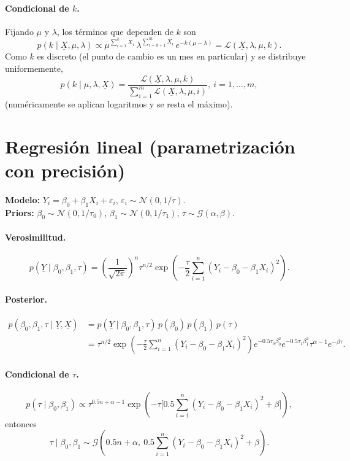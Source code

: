 \documentclass[11pt]{article}
\newcommand{\N}{\mathcal{N}}
\newcommand{\Ga}{\mathcal{G}}
\theoremstyle{definition}
\begin{document}
\paragraph{Condicional de $k$.} Fijando $\mu$ y $\lambda$, los términos que dependen de $k$ son
\[
p(k\mid\underline X,\mu,\lambda)\propto\mu^{\sum_{i=1}^k X_i}\,\lambda^{\sum_{i=k+1}^m X_i}\,e^{-k(\mu-\lambda)}=\mathcal{L}(\underline X,\lambda,\mu,k).
\]
Como $k$ es discreto (el punto de cambio es un mes en particular) y se distribuye uniformemente,
\[
p(k\mid\mu,\lambda,\underline X)=\frac{\mathcal{L}(\underline X,\lambda,\mu,k)}{\sum_{i=1}^m\mathcal{L}(\underline X,\lambda,\mu,i)},\ i=1,\dots,m,
\]
(numéricamente se aplican logaritmos y se resta el máximo).

\section{Regresión lineal (parametrización con precisión)}
\textbf{Modelo:} $Y_i=\beta_0+\beta_1 X_i+\varepsilon_i$, $\varepsilon_i\sim\N(0,1/\tau)$.\\
\textbf{Priors:} $\beta_0\sim\N(0,1/\tau_0)$, $\beta_1\sim\N(0,1/\tau_1)$, $\tau\sim\Ga(\alpha,\beta)$.

\paragraph{Verosimilitud.}
\[
p(\underline Y\mid\beta_0,\beta_1,\tau)=\left(\frac{1}{\sqrt{2\pi}}\right)^n\tau^{n/2}\exp\!\left(-\frac{\tau}{2}\sum_{i=1}^n(Y_i-\beta_0-\beta_1 X_i)^2\right).
\]

\paragraph{Posterior.}
\begin{align*}
p(\beta_0,\beta_1,\tau\mid\underline Y,\underline X)
&=p(\underline Y\mid\beta_0,\beta_1,\tau)\,p(\beta_0)\,p(\beta_1)\,p(\tau)\\
&=\tau^{n/2}\exp\!\left(-\tfrac{\tau}{2}\sum_{i=1}^n(Y_i-\beta_0-\beta_1 X_i)^2\right)e^{-0.5\tau_0\beta_0^2}e^{-0.5\tau_1\beta_1^2}\tau^{\alpha-1}e^{-\beta\tau}.
\end{align*}

\paragraph{Condicional de $\tau$.}
\[
p(\tau\mid\beta_0,\beta_1)\propto\tau^{0.5n+\alpha-1}\exp\!\left(-\tau\Big[0.5\sum_{i=1}^n(Y_i-\beta_0-\beta_1 X_i)^2+\beta\Big]\right),
\]
entonces
\[
\tau\mid\beta_0,\beta_1\sim\Ga\!\left(0.5n+\alpha,\ 0.5\sum_{i=1}^n(Y_i-\beta_0-\beta_1 X_i)^2+\beta\right).
\]
\end{document}
